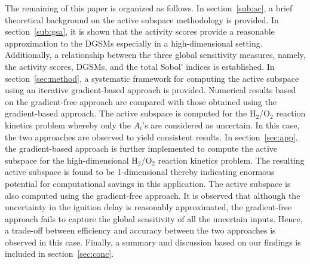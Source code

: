  The remaining of this paper is organized as follows. In section~\ref{sub:ac}, a brief theoretical background on
 the active subspace methodology is provided. In section~\ref{sub:gsa}, it is shown that the activity
 scores provide a reasonable approximation to the DGSMs especially in a high-dimensional setting. 
 Additionally, a relationship between the three global sensitivity measures, namely, the activity scores,
 DGSMs, and the total Sobol' indices is established. In section~\ref{sec:method}, a systematic framework
 for computing the active subspace using an iterative gradient-based approach is provided. Numerical results
 based on the gradient-free approach are compared with those obtained using the gradient-based approach.
 The active subspace is computed for the H$_2$/O$_2$ reaction kinetics problem whereby only
the $A_i$'s are considered as uncertain. In this case, the two approaches are observed to yield consistent
results. In section~\ref{sec:app}, the gradient-based approach is further implemented to compute the
active subspace for the high-dimensional H$_2$/O$_2$ reaction kinetics problem. The resulting active
subspace is found to be 1-dimensional thereby indicating enormous potential for computational savings
in this application. The active subspace is also computed using the gradient-free approach. It is observed
that although the uncertainty in the ignition delay is reasonably approximated, the gradient-free approach
fails to capture the global sensitivity of all the uncertain inputs. Hence, a trade-off between efficiency and
accuracy between the two approaches is observed in this case. 
Finally, a summary and discussion based on our findings is included in section~\ref{sec:conc}.










 




